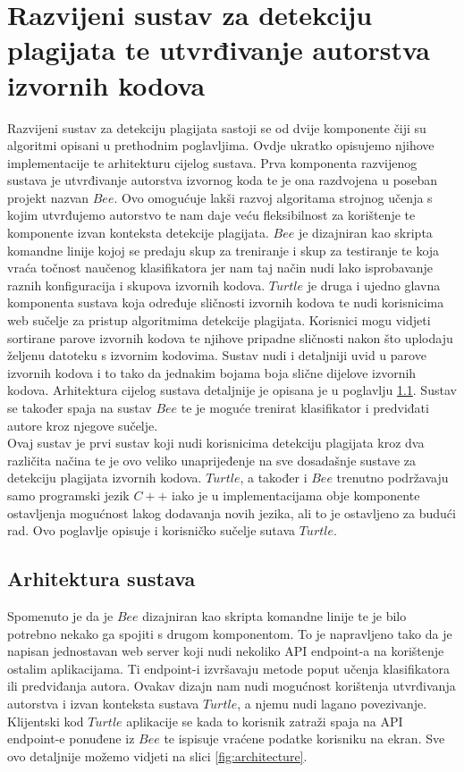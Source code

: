 \chapter{Razvijeni sustav za detekciju plagijata te utvrđivanje autorstva izvornih kodova}

Razvijeni sustav za detekciju plagijata sastoji se od dvije komponente čiji su  algoritmi opisani u prethodnim poglavljima. Ovdje ukratko opisujemo njihove implementacije te arhitekturu cijelog sustava. Prva komponenta razvijenog sustava je utvrđivanje autorstva izvornog koda te je ona razdvojena u poseban projekt nazvan $Bee$. Ovo omogućuje lakši razvoj algoritama strojnog učenja s kojim utvrđujemo autorstvo te nam daje veću fleksibilnost za korištenje te komponente izvan konteksta detekcije plagijata. $Bee$ je dizajniran kao skripta komandne linije kojoj se predaju skup za treniranje i skup za testiranje te koja vraća točnost naučenog klasifikatora jer nam taj način nudi lako isprobavanje raznih konfiguracija i skupova izvornih kodova. $Turtle$ je druga i ujedno glavna komponenta sustava koja određuje sličnosti izvornih kodova te nudi korisnicima web sučelje za pristup algoritmima detekcije plagijata. Korisnici mogu vidjeti sortirane parove izvornih kodova te njihove pripadne sličnosti nakon što uplodaju željenu datoteku s izvornim kodovima. Sustav nudi i detaljniji uvid u parove izvornih kodova i to tako da jednakim bojama boja slične dijelove izvornih kodova. Arhitektura cijelog sustava detaljnije je opisana je u poglavlju \ref{sec:architecture}. Sustav se također spaja na sustav $Bee$ te je moguće trenirat klasifikator i predviđati autore kroz njegove sučelje. 
\\

	Ovaj sustav je prvi sustav koji nudi korisnicima detekciju plagijata kroz dva različita načina te je ovo veliko unaprijeđenje na sve dosadašnje sustave za detekciju plagijata izvornih kodova. $Turtle$, a također i $Bee$ trenutno podržavaju samo programski jezik $C++$ iako je u implementacijama obje komponente ostavljenja mogućnost lakog dodavanja novih jezika, ali to je ostavljeno za budući rad. Ovo poglavlje opisuje i korisničko sučelje sutava $Turtle$.


\section{Arhitektura sustava} \label{sec:architecture}
Spomenuto je da je $Bee$ dizajniran kao skripta komandne linije te je bilo potrebno nekako ga spojiti s drugom komponentom. To je napravljeno tako da je napisan jednostavan web server koji nudi nekoliko API endpoint-a na korištenje ostalim aplikacijama. Ti endpoint-i izvršavaju metode poput učenja klasifikatora ili predviđanja autora. Ovakav dizajn nam nudi mogućnost korištenja utvrđivanja autorstva i izvan konteksta sustava $Turtle$, a njemu nudi lagano povezivanje. Klijentski kod $Turtle$ aplikacije se kada to korisnik zatraži spaja na API endpoint-e ponuđene iz $Bee$ te ispisuje vraćene podatke korisniku na ekran. Sve ovo detaljnije možemo vidjeti na slici \ref{fig:architecture}.


